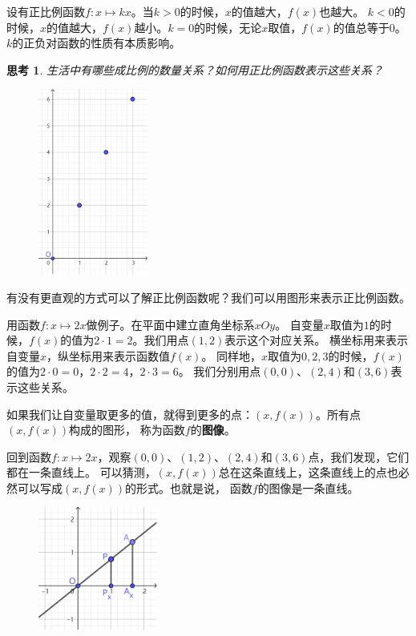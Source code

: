 \documentclass[12pt,UTF8]{ctexbook}
\newtheorem{sk}{思考}[section]
\begin{document}
设有正比例函数$f: x\mapsto kx$。当$k>0$的时候，$x$的值越大，$f(x)$也越大。
$k<0$的时候，$x$的值越大，$f(x)$越小。$k=0$的时候，无论$x$取值，$f(x)$的值总等于$0$。
$k$的正负对函数的性质有本质影响。

\begin{sk}\label{sk:5-0-0}
    生活中有哪些成比例的数量关系？如何用正比例函数表示这些关系？
\end{sk}

\begin{figure} %
    \vspace{-10pt}
    \flushright
    \includegraphics[width=0.32\textwidth]{正比例0.png}
\end{figure}

有没有更直观的方式可以了解正比例函数呢？我们可以用图形来表示正比例函数。

用函数$f: x \mapsto 2x$做例子。在平面中建立直角坐标系$xOy$。
自变量$x$取值为$1$的时候，$f(x)$的值为$2\cdot 1 = 2$。我们用点$(1, 2)$表示这个对应关系。
横坐标用来表示自变量$x$，纵坐标用来表示函数值$f(x)$。
同样地，$x$取值为$0,2,3$的时候，$f(x)$的值为$2\cdot 0 = 0$，$2\cdot 2 = 4$，$2\cdot 3 = 6$。
我们分别用点$(0,0)$、$(2,4)$和$(3,6)$表示这些关系。

如果我们让自变量取更多的值，就得到更多的点：$(x, f(x))$。所有点$(x, f(x))$构成的图形，
称为函数$f$的\textbf{图像}。

回到函数$f: x \mapsto 2x$，观察$(0, 0)$、$(1, 2)$、$(2,4)$和$(3,6)$点，我们发现，它们都在一条直线上。
可以猜测，$(x, f(x))$总在这条直线上，这条直线上的点也必然可以写成$(x, f(x))$的形式。也就是说，
函数$f$的图像是一条直线。

\begin{figure} %
    \vspace{-10pt}
    \flushright
    \includegraphics[width=0.35\textwidth]{正比例1.png}
\end{figure}
\end{document}
